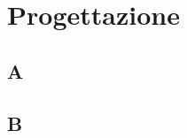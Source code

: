 \documentclass[../relazione.tex]{subfiles}
\begin{document}
\section{Progettazione}
	\subsection{A}
	\subsection{B}
\end{document}

